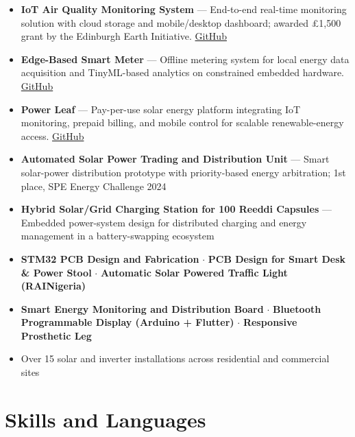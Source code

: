 \documentclass[10pt, a4paper]{article}
\begin{document}
\begin{itemize}
  \item \textbf{IoT Air Quality Monitoring System} --- End-to-end real-time monitoring solution with
        cloud storage and mobile/desktop dashboard; awarded \pounds1{,}500 grant by the Edinburgh
        Earth Initiative. \href{https://github.com/thew0205/iot_air_quality_board/tree/new_firmware_dev}{GitHub}

  \item \textbf{Edge-Based Smart Meter} --- Offline metering system for local energy data acquisition
        and TinyML-based analytics on constrained embedded hardware.
        \href{https://github.com/thew0205/smart_meter/tree/zephyr}{GitHub}

  \item \textbf{Power Leaf} --- Pay-per-use solar energy platform integrating IoT monitoring, prepaid
        billing, and mobile control for scalable renewable-energy access.
        \href{https://github.com/thew0205/power_leaf}{GitHub}

  \item \textbf{Automated Solar Power Trading and Distribution Unit} --- Smart solar-power distribution
        prototype with priority-based energy arbitration; 1st place, SPE Energy Challenge 2024
  \item \textbf{Hybrid Solar/Grid Charging Station for 100 Reeddi Capsules} --- Embedded power-system
        design for distributed charging and energy management in a battery-swapping ecosystem

  \item \textbf{STM32 PCB Design and Fabrication} $\cdot$
        \textbf{PCB Design for Smart Desk \& Power Stool} $\cdot$
        \textbf{Automatic Solar Powered Traffic Light (RAINigeria)}

  \item \textbf{Smart Energy Monitoring and Distribution Board} $\cdot$
        \textbf{Bluetooth Programmable Display (Arduino + Flutter)} $\cdot$
        \textbf{Responsive Prosthetic Leg}

  \item Over 15 solar and inverter installations across residential and commercial sites
\end{itemize}

\section{Skills and Languages}
\end{document}
